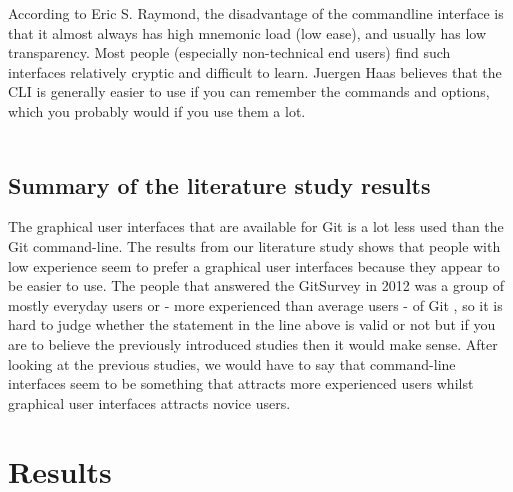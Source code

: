 \documentclass[a4paper,oneside]{bth} %
\begin{document}
			According to Eric S. Raymond\cite{ArtOfUnixProgramming}, the disadvantage of the commandline interface is that it almost always has high mnemonic load (low ease), and usually has low transparency. Most people (especially non-technical end users) find such interfaces relatively cryptic and difficult to learn. \cite{ArtOfUnixProgramming}
			Juergen Haas believes that the CLI is generally easier to use if you can remember the commands and options, which you probably would if you use them a lot. \cite{LinuxGuiVsCli}\\\\
			
			
			\section{Summary of the literature study results}
			The graphical user interfaces that are available for Git is a lot less used than the Git command-line. The results from our literature study shows that people with low experience seem to prefer a graphical user interfaces because they appear to be easier to use. The people that answered the GitSurvey in 2012 was a group of mostly everyday users or - more experienced than average users - of Git \cite{GitUserSurvey}, so it is hard to judge whether the statement in the line above is valid or not but if you are to believe the previously introduced studies then it would make sense. After looking at the previous studies, we would have to say that command-line interfaces seem to be something that attracts more experienced users whilst graphical user interfaces attracts novice users.
			
		
		\chapter{Results}
\end{document}
